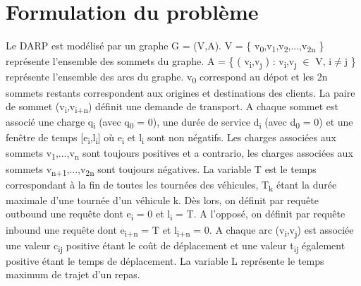 \documentclass[12pt,a4paper]{report}
\begin{document}
\section*{Formulation du problème}
Le DARP est modélisé par un graphe G = (V,A). V = \{ v\textsubscript{0},v\textsubscript{1},v\textsubscript{2},...,v\textsubscript{2n} \} représente l'ensemble des sommets du graphe. 
A = \{ ( v\textsubscript{i},v\textsubscript{j} ) : v\textsubscript{i},v\textsubscript{j} $\in$ V, i$\neq $j \} représente l'ensemble des arcs du graphe.  v\textsubscript{0} correspond au dépot et les 2n sommets restants correspondent aux origines et destinations des clients. La paire de sommet (v\textsubscript{i},v\textsubscript{i+n}) définit une demande de transport.  
A chaque sommet est associé une charge q\textsubscript{i} (avec q\textsubscript{0} = 0), une durée de service d\textsubscript{i} (avec d\textsubscript{0} = 0)  et une fenêtre de temps [e\textsubscript{i},l\textsubscript{i}] où e\textsubscript{i} et l\textsubscript{i} sont non négatifs.
 Les charges associées aux sommets v\textsubscript{1},...,v\textsubscript{n} sont toujours positives et a contrario, les charges associées aux sommets v\textsubscript{n+1},...,v\textsubscript{2n} sont toujours négatives. 
 La variable T est le temps correspondant à la fin de toutes les tournées des véhicules, T\textsubscript{k} étant la durée maximale d'une tournée d'un véhicule k. Dès lors, on définit par requête outbound une requête dont e\textsubscript{i} = 0 et l\textsubscript{i} = T. A l'opposé, on définit par requête inbound une requête dont e\textsubscript{i+n} = T et l\textsubscript{i+n} = 0. 
A chaque arc (v\textsubscript{i},v\textsubscript{j}) est associée une valeur c\textsubscript{ij} positive étant le coût de déplacement et une valeur t\textsubscript{ij} également positive étant le temps de déplacement.
La variable L  représente le temps maximum de trajet d'un repas.
    
\end{document}
